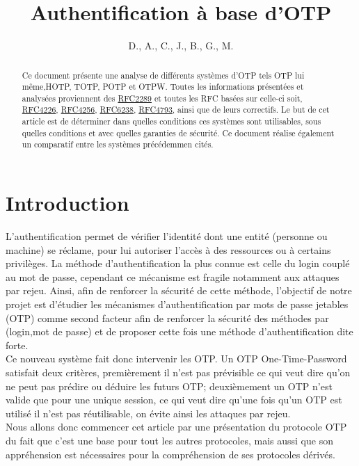 \documentclass{../res/univ-projet}
\title{Authentification à base d'OTP}
\author{D.\bsc{Picard}, A.\bsc{Smondack}, C.\bsc{Hardouin}, J.\bsc{Tayewo}, B.\bsc{Zigh}, G.\bsc{Ferry}, M.\bsc{Michotte} }
\begin{document}
\maketitle

\begin{abstract}
Ce document présente une analyse de différents systèmes d'OTP tels \og{}OTP\fg{} lui même,\og{}HOTP\fg{}, \og{}TOTP\fg{}, \og{}POTP\fg{} 
et \og{}OTPW\fg{}. Toutes les informations présentées et analysées proviennent des \href{http://tools.ietf.org/html/rfc2289}{RFC2289} et 
toutes les RFC basées sur celle-ci soit, \href{http://tools.ietf.org/html/rfc4226}{RFC4226}, \href{http://tools.ietf.org/html/rfc4256}{RFC4256}, 
\href{http://tools.ietf.org/html/rfc6238}{RFC6238}, \href{http://tools.ietf.org/html/rfc4793}{RFC4793}, 
ainsi que de leurs correctifs. Le but de cet article est de déterminer dans quelles conditions ces systèmes sont utilisables, sous quelles conditions 
et avec quelles garanties de sécurité. Ce document réalise également un comparatif entre les systèmes précédemmen cités.
\end{abstract}

\newpage
\tableofcontents
\newpage
\part{Introduction}
L'authentification permet de vérifier l'identité dont une entité (personne ou machine) se réclame, pour lui autoriser l'accès à des
ressources ou à certains privilèges. La méthode d'authentification la plus connue est celle du login couplé au mot de passe, cependant
ce mécanisme est fragile notamment aux attaques par rejeu. Ainsi, afin de renforcer la sécurité de cette méthode, 
l'objectif de notre projet est d'étudier les mécanismes d'authentification par mots de passe jetables (OTP) comme second facteur afin de renforcer la sécurité
des méthodes par (login,mot de passe) et de proposer cette fois une méthode d'authentification dite forte.\\
Ce nouveau système fait donc intervenir les OTP. Un OTP One-Time-Password satisfait deux critères, premièrement il n'est pas prévisible ce qui veut dire qu'on ne peut pas prédire 
ou déduire les futurs OTP; deuxièmement un OTP n'est valide que pour une unique session, ce qui veut dire qu'une fois qu'un OTP est utilisé il n'est pas réutilisable, on évite ainsi les
attaques par rejeu.\\
Nous allons donc commencer cet article par une présentation du protocole OTP du fait que c'est une base pour tout les autres protocoles, mais aussi que son appréhension est nécessaires pour la compréhension
de ses protocoles dérivés.
\setcounter{section}{0}
\end{document}
